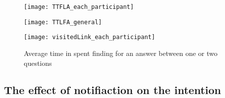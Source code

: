 \begin{figure}[!h]
\centering
\begin{minipage}{.5\textwidth}
  \centering
  \texttt{[image: TTFLA\_each\_participant]}
  \captionsetup{justification=centering}
  \label{fig:TTFA_oneTwoQues}
\end{minipage}%
\begin{minipage}{.5\textwidth}
  \centering
  \texttt{[image: TTLFA\_general]}
  \captionsetup{justification=centering}
  \label{fig:TTLFA_oneTwoQuesGeneral}
\end{minipage}
\end{figure}


\begin{figure}[!h]
\begin{center}
\texttt{[image: visitedLink\_each\_participant]}
\end{center}
\captionsetup{justification=centering}
\caption{Average time in spent finding for an answer between one or two questions}
\label{fig:lookingAnswer_oneOrTwo}
\end{figure}





\subsection{The effect of notifiaction on the intention}
